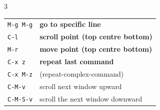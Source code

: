 \documentclass[11pt,landscape,a4paper]{article}
\begin{document}
\begin{multicols}{3}
\begin{tabular}{@{}ll@{}}
	{\verb|M-g M-g|}	 				& \textbf{go to specific line}\\ 
	{\verb|C-l|}	 						& \textbf{scroll point (top centre bottom)}\\ 
	{\verb|M-r|}	 						& \textbf{move point (top centre bottom)}\\ 
	{\verb|C-x z|} 						& \textbf{repeat last command}\\ 
	{\verb|C-x M-z|} 					& (repeat-complex-command)\\
	{\verb|C-M-v|}            & scroll next window upward \\ %
	{\verb|C-M-S-v|}          & scroll the next window downward\\ %
\end{tabular}

%

%


\vspace{1em}




\end{multicols}
\end{document}
